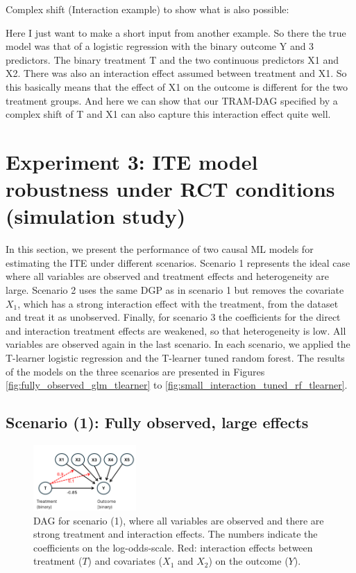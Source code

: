 Complex shift (Interaction example) to show what is also possible:

Here I just want to make a short input from another example. So there the true model was that of a logistic regression with the binary outcome Y and 3 predictors. The binary treatment T and the two continuous predictors X1 and X2. There was also an interaction effect assumed between treatment and X1. So this basically means that the effect of X1 on the outcome is different for the two treatment groups.
And here we can show that our TRAM-DAG specified by a complex shift of T and X1 can also capture this interaction effect quite well.

\clearpage

 
\section{Experiment 3: ITE model robustness under RCT conditions (simulation study)} \label{sec:results_experiment3}

In this section, we present the performance of two causal ML models for estimating the ITE under different scenarios. Scenario 1 represents the ideal case where all variables are observed and treatment effects and heterogeneity are large. Scenario 2 uses the same DGP as in scenario 1 but removes the covariate $X_1$, which has a strong interaction effect with the treatment, from the dataset and treat it as unobserved. Finally, for scenario 3 the coefficients for the direct and interaction treatment effects are weakened, so that heterogeneity is low. All variables are observed again in the last scenario. In each scenario, we applied the T-learner logistic regression and the T-learner tuned random forest. The results of the models on the three scenarios are presented in Figures \ref{fig:fully_observed_glm_tlearner} to \ref{fig:small_interaction_tuned_rf_tlearner}.


\clearpage

\subsection{Scenario (1): Fully observed, large effects}



\begin{figure}[htbp]
\centering
\includegraphics[width=0.35\textwidth]{img/results_ITE_simulation/simulation_observed.png}
\caption{DAG for scenario (1), where all variables are observed and there are strong treatment and interaction effects. The numbers indicate the coefficients on the log-odds-scale. Red: interaction effects between treatment ($T$) and covariates ($X_1$ and $X_2$) on the outcome ($Y$).}
\label{fig:fully_observed_dag}
\end{figure}


